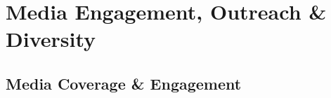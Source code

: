 \documentclass[11pt,letterpaper,sans,unicode]{moderncv}
\begin{document}
\begin{comment}
\subsection{Committees}
\cvitemwithcomment{}{\hspace{2mm}${\color{color1} \circ}\;$ NANOGrav chapter of the {\color{color1} \href{https://www.aps.org/programs/innovation/fund/idea.cfm}{APS Inclusion, Diversity, \& Equity Alliance}}}{Jul 2020--} \vspace{-0.1cm}
\end{comment}


\section{Media Engagement, Outreach \& Diversity}

\subsection{Media Coverage \& Engagement}
\end{document}
